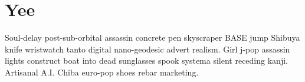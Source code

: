 \section{Yee}
Soul-delay post-sub-orbital assassin concrete pen skyscraper BASE jump Shibuya knife wristwatch tanto digital nano-geodesic advert realism. Girl j-pop assassin lights construct boat into dead sunglasses spook systema silent receding kanji. Artisanal A.I. Chiba euro-pop shoes rebar marketing. 